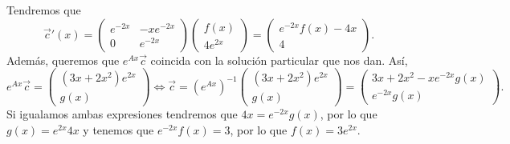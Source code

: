 \begin{eg}
Tendremos que 
\[\vec{c}'\left(x\right)= \begin{pmatrix} e^{-2x} & -xe^{-2x} \\ 0 & e^{-2x}\end{pmatrix}\begin{pmatrix} f\left(x\right) \\ 4e^{2x} \end{pmatrix} = \begin{pmatrix} e^{-2x}f\left(x\right) -4x \\ 4 \end{pmatrix}.\]
Además, queremos que $\displaystyle e^{Ax}\vec{c} $ coincida con la solución particular que nos dan. Así, 
\[e^{Ax}\vec{c} = \begin{pmatrix} \left(3x + 2x^{2}\right)e^{2x} \\ g\left(x\right) \end{pmatrix} \iff \vec{c}=\left(e^{Ax}\right)^{-1}\begin{pmatrix} \left(3x + 2x^{2}\right)e^{2x} \\ g\left(x\right) \end{pmatrix} = \begin{pmatrix} 3x + 2x^{2} -xe^{-2x}g\left(x\right) \\ e^{-2x}g\left(x\right) \end{pmatrix} .\]
Si igualamos ambas expresiones tendremos que $\displaystyle 4x = e^{-2x}g\left(x\right) $, por lo que $\displaystyle g\left(x\right)=e^{2x}4x $ y tenemos que $\displaystyle e^{-2x}f\left(x\right)=3 $, por lo que $\displaystyle f\left(x\right)=3e^{2x} $. 
\end{eg}
